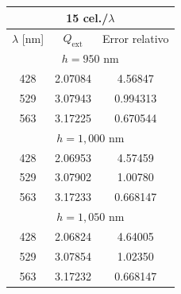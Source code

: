 \begin{center} 
		
		\begin{minipage}[t]{0.48\textwidth}
			\centering
				
			\begin{tabular}{ccc}
				\hline
				\multicolumn{3}{c}{15 cel./$\lambda$}\\ 
				\hline
				$\lambda$ [nm] & $Q_{\text{ext}}$ & Error relativo\\
				\hline
				\multicolumn{3}{c}{$h=950$ nm} \\
				\hline
				428 & 2.07084 & 4.56847 \\
				529 & 3.07943 & 0.994313 \\
				563 & 3.17225 & 0.670544 \\
				\hline
				\multicolumn{3}{c}{$h=1,000$ nm} \\
				\hline
				428 & 2.06953 & 4.57459 \\
				529 & 3.07902 & 1.00780 \\
				563 & 3.17233 & 0.668147 \\
				\hline
				\multicolumn{3}{c}{$h=1,050$ nm} \\
				\hline
				428 & 2.06824 & 4.64005 \\
				529 & 3.07854 & 1.02350 \\
				563 & 3.17232 & 0.668147 \\
				\hline
			\end{tabular}
			\label{table:convergencia_h}
			\vspace{0.2cm} 
		\end{minipage}
		\hfill 
		\begin{minipage}[t]{0.48\textwidth}
			\centering
					

\end{minipage}
\end{center}
